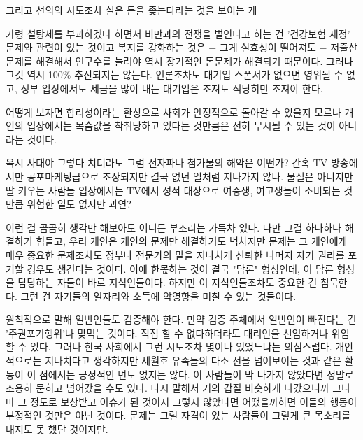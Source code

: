 그리고 선의의 시도조차 실은 돈을 좆는다라는 것을 보이는 게
\vspace{5mm}

가령 설탕세를 부과하겠다 하면서 비만과의 전쟁을 벌인다고 하는 건 '건강보험 재정' 문제와 관련이 있는 것이고
복지를 강화하는 것은 $-$ 그게 실효성이 떨어져도 $-$
저출산 문제를 해결해서 인구수를 늘려야 역시 장기적인 돈문제가 해결되기 때문이다.
그러나 그것 역시 100$\%$ 추진되지는 않는다.
언론조차도 대기업 스폰서가 없으면 영위될 수 없고, 정부 입장에서도 세금을 많이 내는 대기업은 조져도 적당히만 조져야 한다.
\vspace{5mm}

어떻게 보자면 합리성이라는 환상으로 사회가 안정적으로 돌아갈 수 있을지 모르나
개인의 입장에서는 목숨값을 착취당하고 있다는 것만큼은 전혀 무시될 수 있는 것이 아니라는 것이다.
\vspace{5mm}

옥시 사태야 그렇다 치더라도
그럼 전자파나 첨가물의 해악은 어떤가? 간혹 TV 방송에서만 공포마케팅급으로 조장되지만 결국 없던 일처럼 지나가지 않나.
물질은 아니지만 딸 키우는 사람들 입장에서는 TV에서 성적 대상으로 여중생, 여고생들이 소비되는 것만큼 위험한 일도 없지만 과연?
\vspace{5mm}

이런 걸 곰곰히 생각만 해보아도 어디든 부조리는 가득차 있다.
다만 그걸 하나하나 해결하기 힘들고, 우리 개인은 개인의 문제만 해결하기도 벅차지만
문제는 그 개인에게 매우 중요한 문제조차도 정부나 전문가의 말을 지나치게 신뢰한 나머지 자기 권리를 포기할 경우도 생긴다는 것이다.
이에 한몫하는 것이 결국 "담론" 형성인데, 이 담론 형성을 담당하는 자들이 바로 지식인들이다.
하지만 이 지식인들조차도 중요한 건 침묵한다. 그런 건 자기들의 일자리와 소득에 악영향을 미칠 수 있는 것들이다.
\vspace{5mm}

원칙적으로 말해 일반인들도 검증해야 한다. 만약 검증 주체에서 일반인이 빠진다는 건 '주권포기행위'나 맞먹는 것이다.
직접 할 수 없다하더라도 대리인을 선임하거나 위임할 수 있다. 그러나 한국 사회에서 그런 시도조차 몇이나 있었느냐는 의심스럽다.
개인적으로는 지나치다고 생각하지만 세월호 유족들의 다소 선을 넘어보이는 것과 같은 활동이 이 점에서는 긍정적인 면도 없지는 않다.
이 사람들이 막 나가지 않았다면 정말로 조용히 묻히고 넘어갔을 수도 있다.
다시 말해서 거의 갑질 비슷하게 나갔으니까 그나마 그 정도로 보상받고 이슈가 된 것이지 그렇지 않았다면 어땠을까하면
이들의 행동이 부정적인 것만은 아닌 것이다. 문제는 그럴 자격이 있는 사람들이 그렇게 큰 목소리를 내지도 못 했단 것이지만.
\vspace{5mm}






